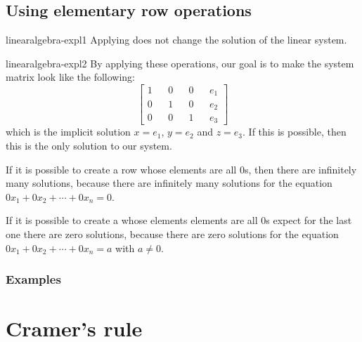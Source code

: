 \documentclass[preview]{standalone}
\begin{document}
\subsection{Using elementary row operations}

\begin{snippet}{linearalgebra-expl1}
    Applying 
    does not change the solution of the linear system.
\end{snippet}


\begin{snippet}{linearalgebra-expl2}
    By applying these operations, our goal is to make the system matrix
    look like the following:
    \[
        \begin{bmatrix} 
            1 && 0 && 0 && e_1 \\
            0 && 1 && 0 && e_2 \\
            0 && 0 && 1 && e_3
        \end{bmatrix}
    \]
    which is the implicit solution
    \(x=e_1\), \(y=e_2\) and \(z=e_3\).
    If this is possible, then this is the only solution to our system.

    \vspace{.25cm}

    If it is possible to create a row whose elements are all \(0\)s,
    then there are infinitely many solutions, because
    there are infinitely many solutions for the equation
    \(0x_1+0x_2+\cdots+0x_n = 0\).

    \vspace{.25cm}

    If it is possible to create a whose elements elements
    are all \(0\)s expect for the last one there are zero solutions,
    because there are zero solutions for the equation
    \(0x_1+0x_2+\cdots+0x_n = a\) with \(a \neq 0\).
\end{snippet}

\subsubsection{Examples}


\section{Cramer's rule}
\end{document}
